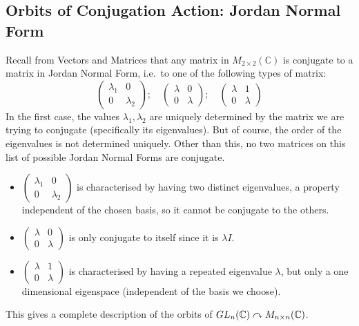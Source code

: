 \subsection{Orbits of Conjugation Action: Jordan Normal Form}
Recall from Vectors and Matrices that any matrix in \(M_{2 \times 2}(\mathbb C)\) is conjugate to a matrix in Jordan Normal Form, i.e.\ to one of the following types of matrix:
\[
	\begin{pmatrix}
		\lambda_1 & 0 \\ 0 & \lambda_2
	\end{pmatrix};\quad \begin{pmatrix}
		\lambda & 0 \\ 0 & \lambda
	\end{pmatrix};\quad \begin{pmatrix}
		\lambda & 1 \\ 0 & \lambda
	\end{pmatrix}
\]
In the first case, the values \(\lambda_1, \lambda_2\) are uniquely determined by the matrix we are trying to conjugate (specifically its eigenvalues).
But of course, the order of the eigenvalues is not determined uniquely.
Other than this, no two matrices on this list of possible Jordan Normal Forms are conjugate.
\begin{itemize}
	\item \(\begin{pmatrix}
		      \lambda_1 & 0 \\ 0 & \lambda_2
	      \end{pmatrix}\) is characterised by having two distinct eigenvalues, a property independent of the chosen basis, so it cannot be conjugate to the others.
	\item \(\begin{pmatrix}
		      \lambda & 0 \\ 0 & \lambda
	      \end{pmatrix}\) is only conjugate to itself since it is \(\lambda I\).
	\item \(\begin{pmatrix}
		      \lambda & 1 \\ 0 & \lambda
	      \end{pmatrix}\) is characterised by having a repeated eigenvalue \(\lambda\), but only a one dimensional eigenspace (independent of the basis we choose).
\end{itemize}
This gives a complete description of the orbits of \(GL_n(\mathbb C) \curvearrowright M_{n \times n}(\mathbb C)\).

